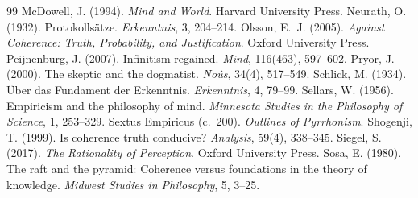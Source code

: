 \documentclass{situationist-preprint}
\begin{document}
\begin{thebibliography}{99}
 McDowell, J. (1994). \emph{Mind and World}. Harvard University Press.
 Neurath, O. (1932). Protokolls\"atze. \emph{Erkenntnis}, 3, 204--214.
 Olsson, E.~J. (2005). \emph{Against Coherence: Truth, Probability, and Justification}. Oxford University Press.
 Peijnenburg, J. (2007). Infinitism regained. \emph{Mind}, 116(463), 597--602.
 Pryor, J. (2000). The skeptic and the dogmatist. \emph{No\^us}, 34(4), 517--549.
 Schlick, M. (1934). \"Uber das Fundament der Erkenntnis. \emph{Erkenntnis}, 4, 79--99.
 Sellars, W. (1956). Empiricism and the philosophy of mind. \emph{Minnesota Studies in the Philosophy of Science}, 1, 253--329.
 Sextus Empiricus (c.~200). \emph{Outlines of Pyrrhonism}.
 Shogenji, T. (1999). Is coherence truth conducive? \emph{Analysis}, 59(4), 338--345.
 Siegel, S. (2017). \emph{The Rationality of Perception}. Oxford University Press.
 Sosa, E. (1980). The raft and the pyramid: Coherence versus foundations in the theory of knowledge. \emph{Midwest Studies in Philosophy}, 5, 3--25.
\end{thebibliography}
\end{document}
